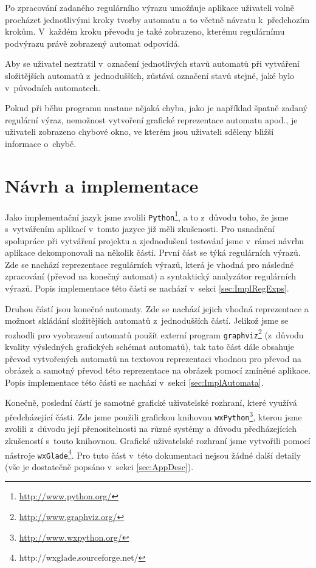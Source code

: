 \documentclass[10pt, notitlepage]{article}
\begin{document}
Po zpracování zadaného regulárního výrazu umožňuje aplikace uživateli volně
procházet jednotlivými kroky tvorby automatu a to včetně návratu k~předchozím
krokům. V~každém kroku převodu je také zobrazeno, kterému regulárnímu podvýrazu
právě zobrazený automat odpovídá.

Aby se uživatel neztratil v~označení jednotlivých stavů automatů při
vytváření složitějších automatů z~jednodušších, zůstává označení stavů stejné,
jaké bylo v~původních automatech.

Pokud při běhu programu nastane nějaká chyba, jako je například špatně zadaný
regulární výraz, nemožnost vytvoření grafické reprezentace automatu apod., je
uživateli zobrazeno chybové okno, ve kterém jsou uživateli sděleny bližší
informace o~chybě.

\section{Návrh a implementace}
\label{sec:Design}

Jako implementační jazyk jsme zvolili
\texttt{Python}\footnote{\url{http://www.python.org/}}, a to z~důvodu toho, že
jsme s~vytvářením aplikací v~tomto jazyce již měli zkušenosti.
Pro usnadnění spolupráce při vytváření projektu a zjednodušení testování jsme
v~rámci návrhu aplikace dekomponovali na několik částí. První část se týká
regulárních výrazů. Zde se nachází reprezentace regulárních výrazů, která je
vhodná pro následné zpracování (převod na konečný automat) a syntaktický
analyzátor regulárních výrazů. Popis implementace této části se nachází
v~sekci \ref{sec:ImplRegExps}.

Druhou částí jsou konečné automaty. Zde se nachází jejich vhodná reprezentace a
možnost skládání složitějších automatů z~jednodušších částí. Jelikož jsme se
rozhodli pro vyobrazení automatů použít externí program
\texttt{graphviz}\footnote{\url{http://www.graphviz.org/}} (z~důvodu kvality
výsledných grafických schémat automatů), tak tato část dále obsahuje převod
vytvořených automatů na textovou reprezentaci vhodnou pro převod na obrázek a
samotný převod této reprezentace na obrázek pomocí zmíněné aplikace. Popis
implementace této části se nachází v~sekci \ref{sec:ImplAutomata}.

Konečně, poslední částí je samotné grafické uživatelské rozhraní, které využívá
předcházející části. Zde jsme použili grafickou knihovnu
\texttt{wxPython}\footnote{\url{http://www.wxpython.org/}}, kterou jsme zvolili
z~důvodu její přenositelnosti na různé systémy a důvodu předházejících
zkušeností s~touto knihovnou. Grafické uživatelské rozhraní jsme vytvořili
pomocí nástroje \texttt{wxGlade}\footnote{http://wxglade.sourceforge.net/}. Pro
tuto část v~této dokumentaci nejsou žádné další detaily (vše je dostatečně
popsáno v~sekci \ref{sec:AppDesc}).
\end{document}
